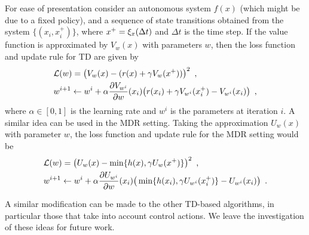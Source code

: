 For ease of presentation consider an autonomous system $f(x)$ (which might be due to a fixed policy), and a sequence of state transitions obtained from the system $\{(x_i,x_i^+)\}$, where $x^+=\xi_x(\Delta t)$ and $\Delta t$ is the time step. If the value function is approximated by $V_w(x)$ with parameters $w$, then the loss function and update rule for TD are given by
%
\begin{equation}
\begin{split}
&\mathcal{L}(w)=\big(V_{w}(x) - (r(x)+\gamma V_{w}(x^+))\big)^2 \enspace,\\
&w^{i+1} \leftarrow w^i + \alpha\frac{\partial V_{w^i}}{\partial w}(x_i)\big(r(x_i)+\gamma V_{w^i}(x^+_i) - V_{w^i}(x_i)\big)\enspace,
\end{split}
\end{equation}%
\noindent where $\alpha \in [0,1]$ is the learning rate and $w^i$ is the parameters at iteration $i$. A similar idea can be used in the MDR setting. Taking the approximation $U_w(x)$ with parameter $w$, the loss function and update rule for the MDR setting would be
%
\begin{equation}
\begin{split}
&\mathcal{L}(w)=\big(U_{w}(x) - \min\{h(x),\gamma U_{w}(x^+)\}\big)^2\enspace,\\
&w^{i+1} \leftarrow w^i + \alpha\frac{\partial U_{w^i}}{\partial w}(x_i)\big(\min\{h(x_i),\gamma U_{w^i}(x^+_i)\} - U_{w^i}(x_i)\big)\enspace.
\end{split}
\end{equation}

A similar modification can be made to the other TD-based algorithms, in particular those that take into account control actions. We leave the investigation of these ideas for future work. 




